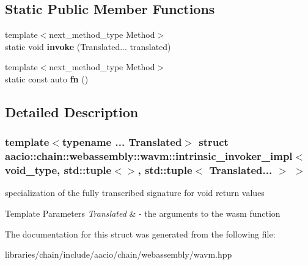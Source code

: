 \subsection*{Static Public Member Functions}
\begin{DoxyCompactItemize}
\item 
\mbox{\label{structaacio_1_1chain_1_1webassembly_1_1wavm_1_1intrinsic__invoker__impl_3_01void__type_00_01std_ca4856f3e4c245f4294d33861b24210b_a64b193b70ac0f66a4052e8775572af67}} 
{\footnotesize template$<$next\+\_\+method\+\_\+type Method$>$ }\\static void {\bfseries invoke} (Translated... translated)
\item 
\mbox{\label{structaacio_1_1chain_1_1webassembly_1_1wavm_1_1intrinsic__invoker__impl_3_01void__type_00_01std_ca4856f3e4c245f4294d33861b24210b_a64fff5d8e321a3e1497f1b566a353789}} 
{\footnotesize template$<$next\+\_\+method\+\_\+type Method$>$ }\\static const auto {\bfseries fn} ()
\end{DoxyCompactItemize}


\subsection{Detailed Description}
\subsubsection*{template$<$typename ... Translated$>$\newline
struct aacio\+::chain\+::webassembly\+::wavm\+::intrinsic\+\_\+invoker\+\_\+impl$<$ void\+\_\+type, std\+::tuple$<$$>$, std\+::tuple$<$ Translated... $>$ $>$}

specialization of the fully transcribed signature for void return values 
\begin{DoxyTemplParams}{Template Parameters}
{\em Translated} & -\/ the arguments to the wasm function \\
\hline
\end{DoxyTemplParams}


The documentation for this struct was generated from the following file\+:\begin{DoxyCompactItemize}
\item 
libraries/chain/include/aacio/chain/webassembly/wavm.\+hpp\end{DoxyCompactItemize}
